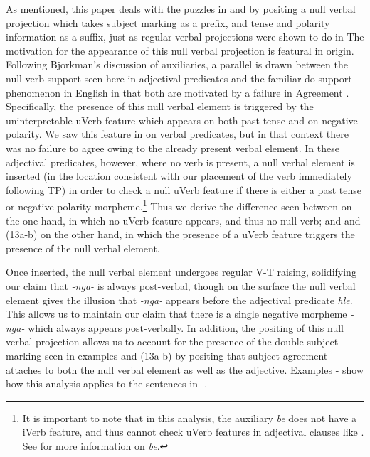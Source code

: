 \documentclass[output=paper]{langsci/langscibook}
\newcommand{\nga}[0]{\textit {-nga- }}
\newcommand{\bee}[0]{\textit {be }}
\begin{document}
As mentioned, this paper deals with the puzzles in  and  by positing a null verbal projection which takes subject marking as a prefix, and tense and polarity information as a suffix, just as regular verbal projections were shown to do in  The motivation for the appearance of this null verbal projection is featural in origin. Following Bjorkman's discussion of auxiliaries, a parallel is drawn between the null verb support seen here in adjectival predicates and the familiar do-support phenomenon in English in that both are motivated by a failure in Agreement \citep{Bjorkman2011}. Specifically, the presence of this null verbal element is triggered by the uninterpretable uVerb feature which appears on both past tense and on negative polarity. We saw this feature in  on verbal predicates, but in that context there was no failure to agree owing to the already present verbal element. In these adjectival predicates, however, where no verb is present, a null verbal element is inserted (in the location consistent with our placement of the verb immediately following TP) in order to check a null uVerb feature if there is either a past tense or negative polarity morpheme.\footnote{It is important to note that in this analysis, the auxiliary \bee does not have a iVerb feature, and thus cannot check uVerb features in adjectival clauses like . See for more information on \textit{be}.} Thus we derive the difference seen between  on the one hand, in which no uVerb feature appears, and thus no null verb; and  and (13a-b) on the other hand, in which the presence of a uVerb feature triggers the presence of the null verbal element.

Once inserted, the null verbal element undergoes regular V-T raising, solidifying our claim that \nga is always post-verbal, though on the surface the null verbal element gives the illusion that \nga appears before the adjectival predicate \textit{hle}. This allows us to maintain our claim that there is a single negative morpheme \nga which always appears post-verbally. In addition, the positing of this null verbal projection allows us to account for the presence of the double subject marking seen in examples  and (13a-b) by positing that subject agreement attaches to both the null verbal element as well as the adjective. Examples - show how this analysis applies to the sentences in -.
\end{document}
